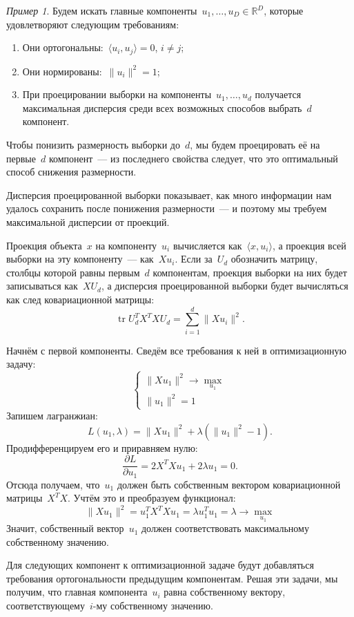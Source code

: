 \documentclass[a4paper, 12pt]{article}
\newcommand{\Tr}{\mathop{\mathrm{tr}}}
\theoremstyle{plain} %
\theoremstyle{definition} %
\theoremstyle{remark} %
\newtheorem{example}{Пример}
\begin{document}
\begin{example}
Будем искать главные компоненты~$u_1, \dots, u_D \in \mathbb{R}^D$, которые удовлетворяют
следующим требованиям:
\begin{enumerate}
    \item Они ортогональны:~$\langle u_i, u_j \rangle = 0$, $i \neq j$;
    \item Они нормированы:~$\|u_i\|^2 = 1$;
    \item При проецировании выборки на компоненты~$u_1, \dots, u_d$ получается
        максимальная дисперсия среди всех возможных способов выбрать~$d$ компонент.
\end{enumerate}

Чтобы понизить размерность выборки до~$d$, мы будем проецировать её на первые~$d$ компонент~---
из последнего свойства следует, что это оптимальный способ снижения размерности.

Дисперсия проецированной выборки показывает, как много информации нам удалось сохранить после
понижения размерности~--- и поэтому мы требуем максимальной дисперсии от проекций.

Проекция объекта~$x$ на компоненту~$u_i$ вычисляется как~$\langle x, u_i \rangle$,
а проекция всей выборки на эту компоненту~--- как~$X u_i$.
Если за~$U_d$ обозначить матрицу, столбцы которой равны первым~$d$ компонентам,
проекция выборки на них будет записываться как~$X U_d$,
а дисперсия проецированной выборки будет вычисляться как след ковариационной матрицы:
\[
    \Tr U_d^T X^T X U_d
    =
    \sum_{i = 1}^{d} \|X u_i\|^2.
\]

Начнём с первой компоненты.
Сведём все требования к ней в оптимизационную задачу:
\[
    \begin{cases}
        \| X u_1 \|^2 \to \max_{u_1} \\
        \|u_1\|^2 = 1
    \end{cases}
\]
Запишем лагранжиан:
\[
    L(u_1, \lambda)
    =
    \| X u_1 \|^2 + \lambda (\|u_1\|^2 - 1).
\]
Продифференцируем его и приравняем нулю:
\[
    \frac{\partial L}{\partial u_1}
    =
    2 X^T Xu_1 + 2 \lambda u_1
    =
    0.
\]
Отсюда получаем, что~$u_1$ должен быть собственным вектором ковариационной матрицы~$X^T X$.
Учтём это и преобразуем функционал:
\[
    \| X u_1 \|^2
    =
    u_1^T X^T X u_1
    =
    \lambda u_1^T u_1
    =
    \lambda
    \to
    \max_{u_1}
\]
Значит, собственный вектор~$u_1$ должен соответствовать максимальному
собственному значению.

Для следующих компонент к оптимизационной задаче будут добавляться требования
ортогональности предыдущим компонентам.
Решая эти задачи, мы получим, что главная компонента~$u_i$
равна собственному вектору, соответствующему~$i$-му собственному значению.


\end{example}
\end{document}
